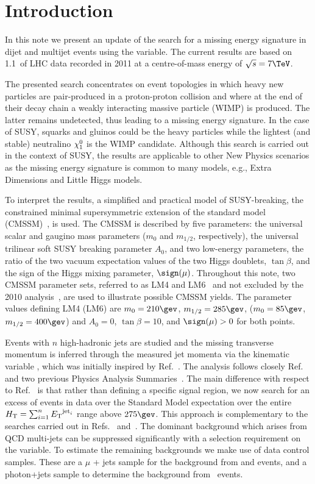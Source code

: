 \section{Introduction \label{sec:intro}}

In this note we present an update of the search for a missing energy
signature in dijet and multijet events using the \alt variable.  The
current results are based on 1.1~\fbinv of LHC data recorded in 2011
at a centre-of-mass energy of $\sqrt{s} = 7 \tev$.

The presented search concentrates on event topologies in which heavy
new particles are pair-produced in a proton-proton collision and where
at the end of their decay chain a weakly interacting massive particle
(WIMP) is produced. The latter remains undetected, thus leading to a
missing energy signature. In the case of SUSY, squarks and gluinos
could be the heavy particles while the lightest (and stable)
neutralino $\chi^{0}_1$ is the WIMP candidate. Although this search is
carried out in the context of SUSY, the results are applicable to
other New Physics scenarios as the missing energy signature is common
to many models, e.g., Extra Dimensions and Little Higgs models.

To interpret the results, a simplified and practical model of
SUSY-breaking, the constrained minimal supersymmetric extension of the
standard model (CMSSM)~\cite{ref:CMSSM, ref:MSUGRA}, is used.  The
CMSSM is described by five parameters: the universal scalar and
gaugino mass parameters ($m_0$ and $m_{1/2}$, respectively), the
universal trilinear soft SUSY breaking parameter $A_0$, and two
low-energy parameters, the ratio of the two vacuum expectation values
of the two Higgs doublets, $\tan\beta$, and the sign of the Higgs
mixing parameter, $\sign(\mu)$.  Throughout this note, two CMSSM
parameter sets, referred to as LM4 and LM6~\cite{PTDRII} and not
excluded by the 2010 analysis~\cite{RA1Paper}, are used to illustrate
possible CMSSM yields.  The parameter values defining LM4 (LM6) are
$m_0=210\gev$, $m_{1/2}=285\gev$, ($m_0=85\gev$, $m_{1/2}=400\gev$)
and $A_0=0$, $\tan\beta=10$, and $\sign(\mu)>0$ for both points.

Events with $n$ high-\pt hadronic jets are studied and the missing
transverse momentum is inferred through the measured jet momenta via
the kinematic variable \alt, which was initially inspired by
Ref.~\cite{Randall:2008rw}.  The analysis follows closely
Ref.~\cite{RA1Paper} and two previous Physics Analysis
Summaries~\cite{cms-pas-sus-09001,cms-pas-sus-08005}.  The main
difference with respect to Ref.~\cite{RA1Paper} is that rather than
defining a specific signal region, we now search for an excess of
events in data over the Standard Model expectation over the entire
$\mbox{$H_\text{T}$} = \sum_{i=1}^{n} {E_{\text T}}^{ {\rm jet}_i}$ range above $275 \gev$.
This approach is complementary to the searches carried out in
Refs.~\cite{RA2} and~\cite{Razor}.  The dominant background which
arises from QCD multi-jets can be suppressed significantly with a
selection requirement on the \alt variable.  To estimate the remaining
backgrounds we make use of data control samples. These are a $\mu$ +
jets sample for the background from \wj and \ttbar events, and a
photon+jets sample to determine the background from \znunu\ events.

